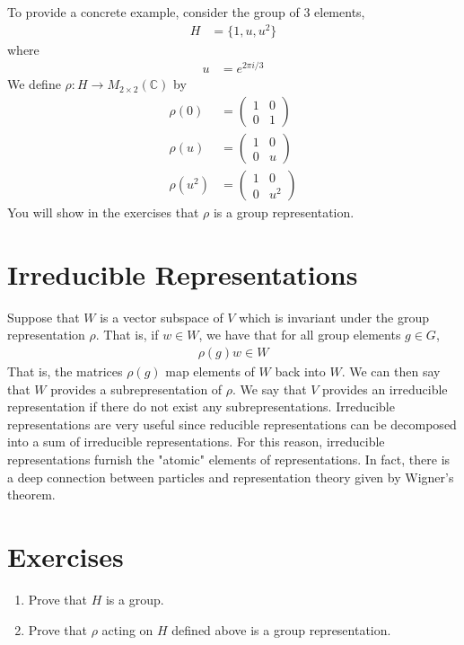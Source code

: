 \documentclass[book.tex]{subfiles}
\begin{document}
To provide a concrete example, consider the group of 3 elements, 
\begin{align}
H &= \{1, u, u^2\}
\end{align}
where
\begin{align}
u &= e^{2\pi i / 3}
\end{align}
We define $\rho: H \to M_{2 \times 2}(\mathbb{C})$ by
\begin{align}
\rho(0) &= \begin{pmatrix}
1 & 0 \\
0 & 1 
\end{pmatrix}\\
\rho(u) &= \begin{pmatrix}
1 & 0 \\
0 & u 
\end{pmatrix} \\
\rho(u^2) &= \begin{pmatrix}
1 & 0 \\
0 & u^2 
\end{pmatrix} 
\end{align}
You will show in the exercises that $\rho$ is a group representation.


\section{Irreducible Representations}
Suppose that $W$ is a vector subspace of $V$ which is invariant under the group representation $\rho$. That is, if $w \in W$, we have that for all group elements $g \in G$,
\begin{align}
\rho(g) w \in W
\end{align}
That is, the matrices $\rho(g)$ map elements of $W$ back into $W$. We can then say that $W$ provides a subrepresentation of $\rho$. We say that $V$ provides an irreducible representation if there do not exist any subrepresentations. Irreducible representations are very useful since reducible representations can be decomposed into a sum of irreducible representations. For this reason, irreducible representations furnish the "atomic" elements of representations. In fact, there is a deep connection between particles and representation theory given by Wigner's theorem.



\section{Exercises}
\begin{enumerate}
    \item Prove that $H$ is a group. 
    \item Prove that $\rho$ acting on $H$ defined above is a group representation.
\end{enumerate}
\end{document}
